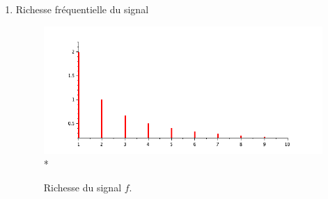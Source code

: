 \documentclass[a4paper,12pt]{report}
\begin{document}
\begin{enumerate}
\begin{enumerate}
			\item Richesse fréquentielle du signal
			\begin{figure}[h!]
				\centering
				\includegraphics[scale=0.6]{ex1_fig2_2.png}\\*
				\caption{\label{ex1_figure2_2}Richesse du signal $f$.}
			\end{figure}\\
		\end{enumerate}
				\newpage
		

\end{enumerate}
\end{document}
